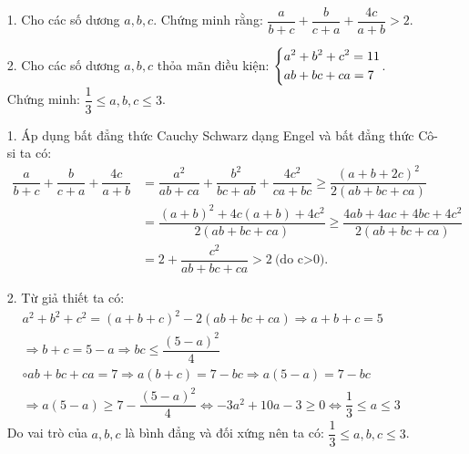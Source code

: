 \begin{ex}%
\hfill
    \begin{enumerate}
        \item[1.] Cho các số dương $a,b,c$. Chứng minh rằng: $\dfrac{a}{b+c}+\dfrac{b}{c+a}+\dfrac{4c}{a+b}>2$.
        \item[2.] Cho các số dương $a,b,c$ thỏa mãn điều kiện: $\left\{\begin{aligned}&a^2+b^2+c^2=11\\&ab+bc+ca=7\end{aligned}\right.$.\\
        Chứng minh: $\dfrac{1}{3}\le a,b,c\le 3$.
    \end{enumerate}
\loigiai
    {
   \begin{enumerate}
   \item[1.] Áp dụng bất đẳng thức Cauchy Schwarz dạng Engel và bất đẳng thức Cô-si ta có:\\
   $
\begin{aligned} 
   \dfrac{a}{b+c}+\dfrac{b}{c+a}+\dfrac{4c}{a+b}&=\dfrac{a^2}{ab+ca}+\dfrac{b^2}{bc+ab}+\dfrac{4c^2}{ca+bc}\ge \dfrac{\left(a+b+2c\right)^2}{2\left(ab+bc+ca\right)}\\&=\dfrac{\left(a+b\right)^2+4c\left(a+b\right)+4c^2}{2\left(ab+bc+ca\right)}\ge \dfrac{4ab+4ac+4bc+4c^2}{2\left(ab+bc+ca\right)}\\&=2+\dfrac{c^2}{ab+bc+ca}> 2\ \text{(do c>0)}.
   \end{aligned}
   $
   \item[2.] Từ giả thiết ta có:\\
    $
\begin{aligned}
    &a^2+b^2+c^2=\left(a+b+c\right)^2-2\left(ab+bc+ca\right)\Rightarrow a+b+c =5\\
    &\Rightarrow b+c=5-a\Rightarrow bc\le \dfrac{\left(5-a\right)^2}{4}\\
    &\circ ab+bc+ca=7\Rightarrow a(b+c)=7-bc\Rightarrow a(5-a)=7-bc\\
    &\Rightarrow a(5-a)\ge 7-\dfrac{(5-a)^2}{4}
    \Leftrightarrow -3a^2+10a-3\ge 0\Leftrightarrow \dfrac{1}{3}\le a\le 3
   \end{aligned}
   $\\
   Do vai trò của $a,b,c$ là bình đẳng và đối xứng nên ta có: $\dfrac{1}{3}\le a,b,c\le 3$.
   \end{enumerate}
    }
\end{ex}

